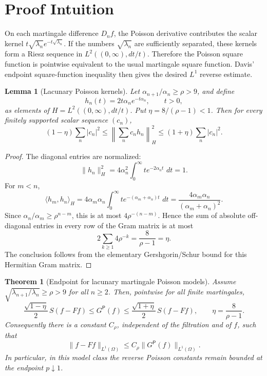 \documentclass[11pt]{article}
\newtheorem{theorem}{Theorem}
\newtheorem{lemma}{Lemma}
\newcommand{\dd}{\,d}
\newcommand{\sfP}{\mathsf P}
\begin{document}
\section*{Proof Intuition}

On each martingale difference \(D_n f\), the Poisson derivative contributes the
scalar kernel \(t\sqrt{\lambda_n}e^{-t\sqrt{\lambda_n}}\).  If the numbers
\(\sqrt{\lambda_n}\) are sufficiently separated, these kernels form a Riesz
sequence in \(L^2((0,\infty),dt/t)\).  Therefore the Poisson square function is
pointwise equivalent to the usual martingale square function.  Davis'
endpoint square-function inequality then gives the desired \(L^1\) reverse
estimate.

\begin{lemma}[Lacunary Poisson kernels]
\label{lem:gram}
Let \(\alpha_{n+1}/\alpha_n\ge \rho>9\), and define
\[
  h_n(t)=2t\alpha_n e^{-t\alpha_n},\qquad t>0,
\]
as elements of \(H=L^2((0,\infty),dt/t)\).  Put
\(\eta=8/(\rho-1)<1\).  Then for every finitely supported scalar sequence
\((c_n)\),
\[
  (1-\eta)\sum_n |c_n|^2
  \le \left\|\sum_n c_n h_n\right\|_H^2
  \le (1+\eta)\sum_n |c_n|^2 .
\]
\end{lemma}

\begin{proof}
The diagonal entries are normalized:
\[
  \|h_n\|_H^2=4\alpha_n^2\int_0^\infty t e^{-2\alpha_n t}\,\dd t=1.
\]
For \(m<n\),
\[
  \langle h_m,h_n\rangle_H
  =4\alpha_m\alpha_n\int_0^\infty t e^{-(\alpha_m+\alpha_n)t}\,\dd t
  =\frac{4\alpha_m\alpha_n}{(\alpha_m+\alpha_n)^2}.
\]
Since \(\alpha_n/\alpha_m\ge \rho^{n-m}\), this is at most
\(4\rho^{-(n-m)}\).  Hence the sum of absolute off-diagonal entries in every
row of the Gram matrix is at most
\[
  2\sum_{k\ge1}4\rho^{-k}=\frac{8}{\rho-1}=\eta .
\]
The conclusion follows from the elementary Gershgorin/Schur bound for this
Hermitian Gram matrix.
\end{proof}

\begin{theorem}[Endpoint for lacunary martingale Poisson models]
\label{thm:endpoint}
Assume \(\sqrt{\lambda_{n+1}/\lambda_n}\ge\rho>9\) for all \(n\ge2\).
Then, pointwise for all finite martingales,
\[
  \frac{\sqrt{1-\eta}}{2}\,S(f-Ff)
  \le G^{\sfP}(f)
  \le \frac{\sqrt{1+\eta}}{2}\,S(f-Ff),
  \qquad \eta=\frac{8}{\rho-1}.
\]
Consequently there is a constant \(C_\rho\), independent of the filtration and
of \(f\), such that
\[
  \|f-Ff\|_{L^1(\Omega)} \le C_\rho\|G^{\sfP}(f)\|_{L^1(\Omega)} .
\]
In particular, in this model class the reverse Poisson constants remain
bounded at the endpoint \(p\downarrow1\).
\end{theorem}
\end{document}
